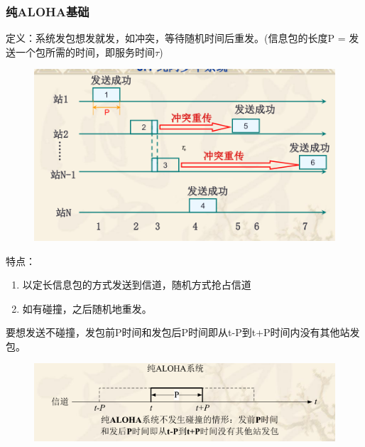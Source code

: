 \subsubsection{纯ALOHA基础}
定义：系统发包想发就发，如冲突，等待随机时间后重发。(信息包的长度P = 发送一个包所需的时间，即服务时间$ \tau $)
\begin{figure}[H]
	\centering
	\includegraphics[width=0.7\linewidth]{figures/screenshot002}
	\caption{}
	\label{fig:screenshot002}
\end{figure}
特点：
\begin{enumerate}
	\item 以定长信息包的方式发送到信道，随机方式抢占信道
	\item 如有碰撞，之后随机地重发。
\end{enumerate}
要想发送不碰撞，发包前P时间和发包后P时间即从t-P到t+P时间内没有其他站发包。
\begin{figure}
	\centering
	\includegraphics[width=0.7\linewidth]{figures/screenshot003}
	\caption{}
	\label{fig:screenshot003}
\end{figure}
